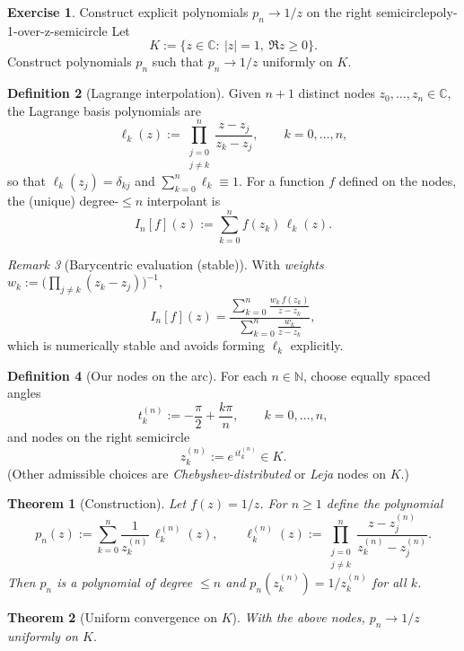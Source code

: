 \documentclass[11pt,a4paper]{article}
\newtheorem{theorem}{Theorem}
\theoremstyle{definition}
\newtheorem{exercise}{Exercise} %
\theoremstyle{definition}
\newtheorem{definition}[exercise]{Definition}
\theoremstyle{plain}
\theoremstyle{remark}
\newtheorem{remark}[exercise]{Remark}
\begin{document}

\begin{exercise}{Construct explicit polynomials $p_n\to 1/z$ on the right semicircle}{poly-1-over-z-semicircle}
	Let
	\[
	K:=\{z\in\mathbb C:\ |z|=1,\ \Re z\ge 0\}.
	\]
	Construct polynomials $p_n$ such that $p_n\to 1/z$ uniformly on $K$.
\end{exercise}

\begin{definition}[Lagrange interpolation]
	Given $n{+}1$ distinct nodes $z_0,\dots,z_n\in\mathbb C$, the Lagrange basis polynomials are
	\[
	\ell_k(z):=\prod_{\substack{j=0\\ j\ne k}}^{n}\frac{z-z_j}{z_k-z_j},\qquad k=0,\dots,n,
	\]
	so that $\ell_k(z_j)=\delta_{kj}$ and $\sum_{k=0}^n \ell_k\equiv1$.  
	For a function $f$ defined on the nodes, the (unique) degree-$\le n$ interpolant is
	\[
	I_n[f](z):=\sum_{k=0}^{n} f(z_k)\,\ell_k(z).
	\]
\end{definition}

\begin{remark}[Barycentric evaluation (stable)]
	With \emph{weights} $w_k:=\big(\prod_{j\ne k}(z_k-z_j)\big)^{-1}$,
	\[
	I_n[f](z)=\frac{\displaystyle\sum_{k=0}^{n}\frac{w_k\,f(z_k)}{z-z_k}}
	{\displaystyle\sum_{k=0}^{n}\frac{w_k}{z-z_k}},
	\]
	which is numerically stable and avoids forming $\ell_k$ explicitly.
\end{remark}

\begin{definition}[Our nodes on the arc]
	For each $n\in\mathbb N$, choose equally spaced angles
	\[
	t_k^{(n)}:=-\frac{\pi}{2}+\frac{k\pi}{n},\qquad k=0,\dots,n,
	\]
	and nodes on the right semicircle
	\[
	z_k^{(n)}:=e^{\,i t_k^{(n)}}\in K.
	\]
	(Other admissible choices are \emph{Chebyshev-distributed} or \emph{Leja} nodes on $K$.)
\end{definition}

\begin{theorem}[Construction]
	Let $f(z)=1/z$. For $n\ge1$ define the polynomial
	\[
	p_n(z):=\sum_{k=0}^{n}\frac{1}{z_k^{(n)}}\,\ell_k^{(n)}(z),\qquad
	\ell_k^{(n)}(z):=\prod_{\substack{j=0\\ j\ne k}}^{n}\frac{z-z_j^{(n)}}{z_k^{(n)}-z_j^{(n)}}.
	\]
	Then $p_n$ is a polynomial of degree $\le n$ and $p_n(z_k^{(n)})=1/z_k^{(n)}$ for all $k$.
\end{theorem}

\begin{theorem}[Uniform convergence on $K$]\label{thm:unif-conv-arc}
	With the above nodes, $p_n\to 1/z$ uniformly on $K$.
\end{theorem}
\end{document}
